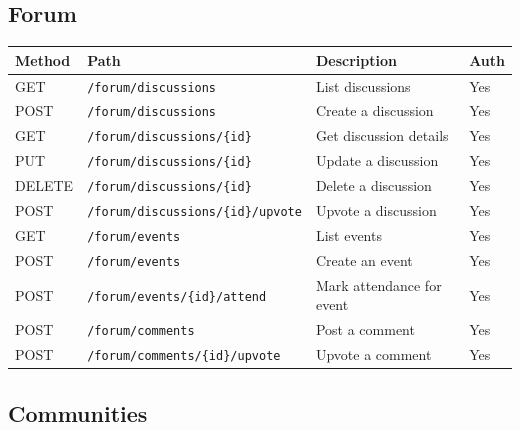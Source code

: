 \documentclass[11pt,a4paper]{report}
\begin{document}
\subsection{Forum}

\begin{longtable}{|l|p{6.5cm}|p{5cm}|l|}
    \hline
    \textbf{Method} & \textbf{Path}                             & \textbf{Description}      & \textbf{Auth} \\
    \hline
    \endhead
    GET             & \texttt{/forum/discussions}               & List discussions          & Yes           \\
    \hline
    POST            & \texttt{/forum/discussions}               & Create a discussion       & Yes           \\
    \hline
    GET             & \texttt{/forum/discussions/\{id\}}        & Get discussion details    & Yes           \\
    \hline
    PUT             & \texttt{/forum/discussions/\{id\}}        & Update a discussion       & Yes           \\
    \hline
    DELETE          & \texttt{/forum/discussions/\{id\}}        & Delete a discussion       & Yes           \\
    \hline
    POST            & \texttt{/forum/discussions/\{id\}/upvote} & Upvote a discussion       & Yes           \\
    \hline
    GET             & \texttt{/forum/events}                    & List events               & Yes           \\
    \hline
    POST            & \texttt{/forum/events}                    & Create an event           & Yes           \\
    \hline
    POST            & \texttt{/forum/events/\{id\}/attend}      & Mark attendance for event & Yes           \\
    \hline
    POST            & \texttt{/forum/comments}                  & Post a comment            & Yes           \\
    \hline
    POST            & \texttt{/forum/comments/\{id\}/upvote}    & Upvote a comment          & Yes           \\
    \hline
\end{longtable}

\subsection{Communities}
\end{document}
